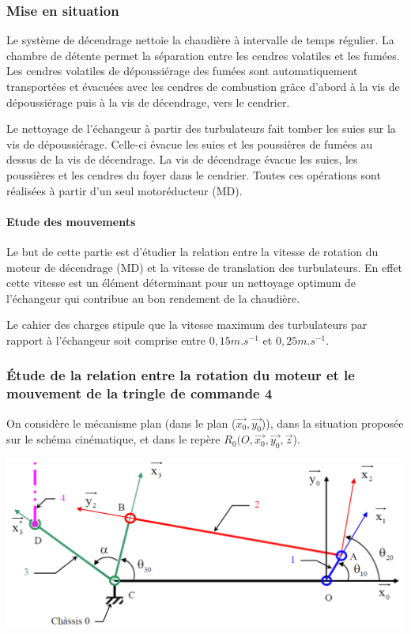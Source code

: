 \subsubsection{Mise en situation}

Le système de décendrage nettoie la chaudière à intervalle de temps régulier. La chambre de détente permet la séparation entre les cendres volatiles et les fumées. Les cendres volatiles de dépoussiérage des fumées sont automatiquement transportées et évacuées avec les cendres de combustion grâce d'abord à la vis de dépoussiérage puis à la vis de décendrage, vers le cendrier.

Le nettoyage de l'échangeur à partir des turbulateurs fait tomber les suies sur la vis de dépoussiérage. Celle-ci évacue les suies et les poussières de fumées au dessus de la vis de décendrage. La vis de décendrage évacue les suies, les poussières et les cendres du foyer dans le cendrier. Toutes ces opérations sont réalisées à partir d'un seul motoréducteur (MD).

\paragraph{Etude des mouvements}

Le but de cette partie est d'étudier la relation entre la vitesse de rotation du moteur de décendrage (MD) et la vitesse de translation des turbulateurs. En effet cette vitesse est un élément déterminant pour un nettoyage optimum de l'échangeur qui contribue au bon rendement de la chaudière.

Le cahier des charges stipule que la vitesse maximum des turbulateurs par rapport à l'échangeur soit comprise entre $0,15m.s^{-1}$ et $0,25m.s^{-1}$.

\subsubsection{Étude de la relation entre la rotation du moteur et le mouvement de la tringle de commande 4}

On considère le mécanisme plan (dans le plan ($\overrightarrow{x_0},\overrightarrow{y_0}$)), dans la situation proposée sur le schéma cinématique, et dans le repère $R_0(O,\overrightarrow{x_0},\overrightarrow{y_0},\overrightarrow{z}$).

\begin{center}
	\includegraphics[width=0.6\linewidth]{img/Chaudiere_cinematique}
\end{center}

